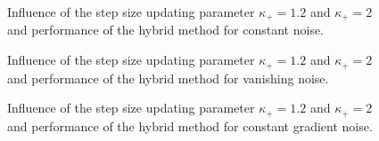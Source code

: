 \vspace{-1.5em}

\begin{figure}[H]
	\begin{subfigure}{0.49\textwidth}
	\end{subfigure}
	\begin{subfigure}{0.49\textwidth}
	\end{subfigure}
	\caption{Influence of the step size updating parameter \(\kappa_+ = 1.2\) and \(\kappa_+ =2 \) and performance of the hybrid method for constant noise.}%
	\label{fig_const_noise_comp_large}%
\end{figure}

\vspace{-1.5em}

\begin{figure}[H]
	\begin{subfigure}{0.49\textwidth}
	\end{subfigure}
	\begin{subfigure}{0.49\textwidth}
	\end{subfigure}
	\caption{Influence of the step size updating parameter \(\kappa_+ = 1.2\) and \(\kappa_+ =2 \) and performance of the hybrid method for vanishing noise.}%
	\label{fig_van_noise_comp_large}%
\end{figure}

\vspace{-1.5em}

\begin{figure}[H]
	\begin{subfigure}{0.49\textwidth}
	\end{subfigure}
	\begin{subfigure}{0.49\textwidth}
	\end{subfigure}
	\caption{Influence of the step size updating parameter \(\kappa_+ = 1.2\) and \(\kappa_+ =2 \) and performance of the hybrid method for constant gradient noise.}%
	\label{fig_const_grad_noise_comp_large}%
\end{figure}

